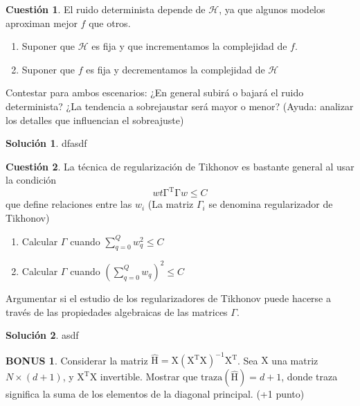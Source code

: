 \documentclass[a4paper, 11pt]{article}
\theoremstyle{definition}
\newtheorem{cuestion}{Cuestión}
\newtheorem*{solucion}{Solución}
\newtheorem*{bonus}{BONUS}
\begin{document}
  \begin{cuestion}
    El ruido determinista depende de $\mathcal{H}$, ya que algunos modelos aproximan mejor $f$ que otros.
    \begin{enumerate}
        \item Suponer que $\mathcal{H}$ es fija y que incrementamos la complejidad de $f$.
        \item Suponer que $ f$ es fija y decrementamos la complejidad de $\mathcal{H}$
    \end{enumerate}
    Contestar para ambos escenarios: ¿En general subirá o bajará el ruido determinista? ¿La tendencia a sobrejaustar será mayor o menor? (Ayuda: analizar los detalles que influencian el sobreajuste)
  \end{cuestion}

  \begin{solucion}
    dfasdf
  \end{solucion}


  \begin{cuestion}
    La técnica de regularización de Tikhonov es bastante general al usar la condición
    \[
    wt\mathrm{\Gamma^T\Gamma}w\leq C
    \]
    que define relaciones entre las $w_i$ (La matriz $\Gamma_i$ se denomina regularizador de Tikhonov)
    \begin{enumerate}
    \item Calcular $\Gamma$ cuando $\sum_{q=0}^Q w_q^2 \leq C$
    \item Calcular $\Gamma$ cuando $(\sum_{q=0}^Q w_q)^2 \leq C$
    \end{enumerate}
    Argumentar si el estudio de los regularizadores de Tikhonov puede hacerse a través de las propiedades algebraicas de las matrices $\Gamma$.
  \end{cuestion}

  \begin{solucion}
    asdf
  \end{solucion}

  \begin{bonus}
    Considerar la matriz $\hat{\mathrm{H}}=\mathrm{X(X^TX)^{-1}X^T}$. Sea $\mathrm{X}$ una matriz  $N\times (d+1)$, y $\mathrm{X^TX}$ invertible. Mostrar que $\mathrm{traza(\hat{H})}=d+1$, donde traza significa la suma de los elementos de la diagonal principal. (+1 punto)
  \end{bonus}
\end{document}
